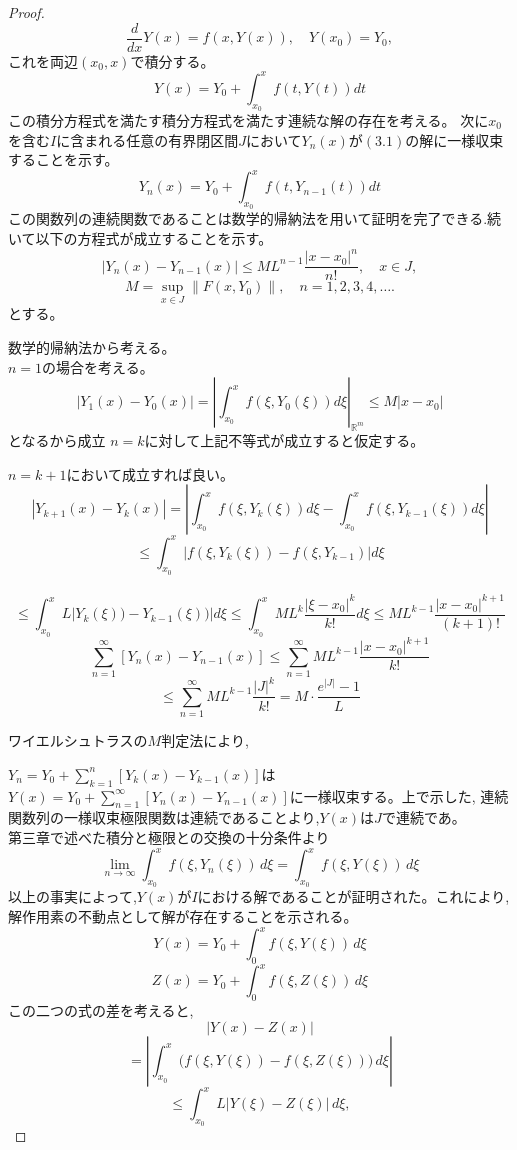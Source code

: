 \documentclass[a4paper]{article}
\begin{document}
    \begin{proof}
        \[\frac{d}{dx}Y(x) = f(x, Y(x)), \quad Y(x_{0}) = Y_{0},\]
        これを両辺$(x_{0},x)$で積分する。
        \[Y(x)=Y_{0}+\displaystyle \int_{x_{0}}^{x} f(t,Y(t)) dt\]
        この積分方程式を満たす積分方程式を満たす連続な解の存在を考える。
        次に$x_{0}$を含む$I$に含まれる任意の有界閉区間$J$において$Y_{n}(x)$が$(3.1)$の解に一様収束することを示す。
        \[Y_{n}(x)=Y_{0}+\displaystyle \int_{x_{0}}^{x} f(t,Y_{n-1}(t)) dt\]
        この関数列の連続関数であることは数学的帰納法を用いて証明を完了できる.続いて以下の方程式が成立することを示す。
        \[
        | Y_{n}(x) - Y_{n-1}(x) | \leq M L^{n-1} \frac{|x - x_0|^{n}}{n!}, \quad x \in J,
        \]
        \[
        M = \sup_{x \in J} \|F(x, Y_0)\|, \quad n = 1, 2, 3, 4, \dots.
        \]
        とする。

            数学的帰納法から考える。\\
            $n=1$の場合を考える。
            \[\left| Y_{1}(x)-Y_{0}(x) \right| =\left|\displaystyle \int_{x_{0}}^{x}  f(\xi,Y_{0}(\xi)) d\xi \right|_{\mathbb{R}^{m}}\leq M|x-x_{0}| \]
        となるから成立
        $n=k$に対して上記不等式が成立すると仮定する。

        $n=k+1$において成立すれば良い。
        \[\left| Y_{k+1}(x)-Y_{k}(x) \right| =  \left|\displaystyle \int_{x_{0}}^{x}  f(\xi,Y_{k}(\xi)) d\xi -\displaystyle \int_{x_{0}}^{x}  f(\xi,Y_{k-1}(\xi)) d\xi\right| \]
        \[\leq \displaystyle  \int_{x_{0}}^{x}  \left|f(\xi,Y_{k}(\xi))-f(\xi,Y_{k-1})\right| d\xi \]\
        \[\leq \displaystyle  \int_{x_{0}}^{x}  L\left|Y_{k}(\xi))-Y_{k-1}(\xi))\right| d\xi \leq \displaystyle  \int_{x_{0}}^{x}ML^{k} \frac{\left|\xi - x_0\right|^{k}}{k!} d\xi \leq ML^{k-1}\frac{\left|x - x_0\right|^{k+1}}{(k+1)!}\]
        \[ \displaystyle\sum_{n=1}^{\infty}[Y_{n}(x)-Y_{n-1}(x)] \leq  \displaystyle\sum_{n=1}^{\infty}ML^{k-1}\frac{\left|x - x_0\right|^{k+1}}{k!}\]
        \[\leq \displaystyle\sum_{n=1}^{\infty}ML^{k-1}\frac{\left|J\right|^{k}}{k!}=M \cdot \frac{e^{|J|}-1}{L}\]

        ワイエルシュトラスの$M$判定法により,

        $Y_{n}=Y_{0}+\displaystyle\sum_{k=1}^{n} [Y_{k}(x)-Y_{k-1}(x)]$は$Y(x)=Y_{0}+\displaystyle\sum_{n=1}^{\infty} [Y_{n}(x)-Y_{n-1}(x)]$に一様収束する。上で示した, 連続関数列の一様収束極限関数は連続であることより,$Y(x)$は$J$で連続であ。\\
        第三章で述べた積分と極限との交換の十分条件より
        \[\lim_{n \to \infty} \displaystyle \int_{x_{0}}^{x} f(\xi,Y_{n}(\xi)) \, d\xi = \displaystyle \int_{x_{0}}^{x} f(\xi,Y(\xi)) \, d\xi \]
        以上の事実によって,$Y(x)$が$I$における解であることが証明された。これにより,解作用素の不動点として解が存在することを示される。
        \[
        Y(x) = Y_{0} + \displaystyle \int_{0}^{x} f(\xi, Y(\xi)) \, d\xi
        \]
        \[
        Z(x) = Y_{0} + \displaystyle \int_{0}^{x} f(\xi, Z(\xi)) \, d\xi
        \]
        この二つの式の差を考えると,
        \[
        |Y(x) - Z(x)|
        \]
        \[
        = \left| \displaystyle \int_{x_{0}}^{x} \big( f(\xi, Y(\xi)) - f(\xi, Z(\xi)) \big) \, d\xi \right|
        \]
        \[
        \leq \displaystyle \int_{x_{0}}^{x} L |Y(\xi) - Z(\xi)| \, d\xi,
        \]



\end{proof}
\end{document}
